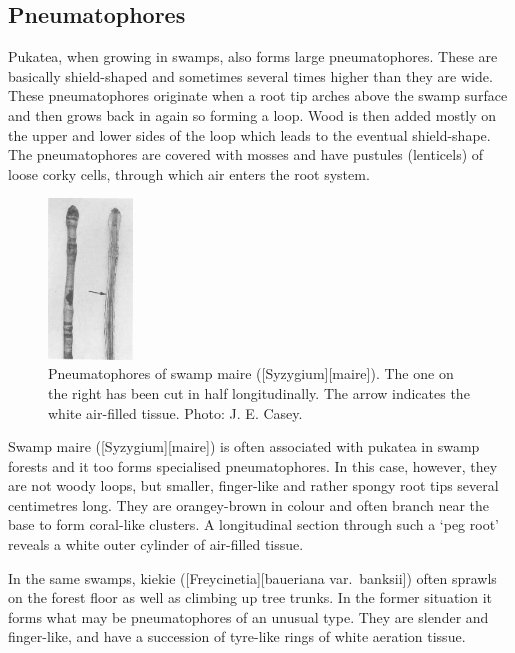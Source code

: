 \subsection{Pneumatophores}

Pukatea, when growing in swamps, also forms large pneumatophores.
These are basically shield-shaped and sometimes several times higher than they are wide.
These pneumatophores originate when a root tip arches above the swamp surface and then grows back in again so forming a loop.
Wood is then added mostly on the upper and lower sides of the loop which leads to the eventual shield-shape.
The pneumatophores are covered with mosses and have pustules (lenticels) of loose corky cells, through which air enters the root system.

\begin{figure}
	\includegraphics[width=0.2\textwidth]{graphics/figure12swampmaire.jpg}
	\centering
	\caption[Pneumatophores of swamp maire]{Pneumatophores of swamp maire ([Syzygium][maire]).
	The one on the right has been cut in half longitudinally.
	The arrow indicates the white air-filled tissue.
	Photo:  J. E. Casey.}%
	\label{fig:12swampmaire}
\end{figure}

Swamp maire ([Syzygium][maire]) is often associated with pukatea in swamp forests and it too forms specialised pneumatophores.
In this case, however, they are not woody loops, but smaller, finger-like and rather spongy root tips several centimetres long.
They are orangey-brown in colour and often branch near the base to form coral-like clusters.
A longitudinal section through such a `peg root' reveals a white outer cylinder of air-filled tissue.

In the same swamps, kiekie ([Freycinetia][baueriana var.\ banksii]) often sprawls on the forest floor as well as climbing up tree trunks.
In the former situation it forms what may be pneumatophores of an unusual type.
They are slender and finger-like, and have a succession of tyre-like rings of white aeration tissue.

